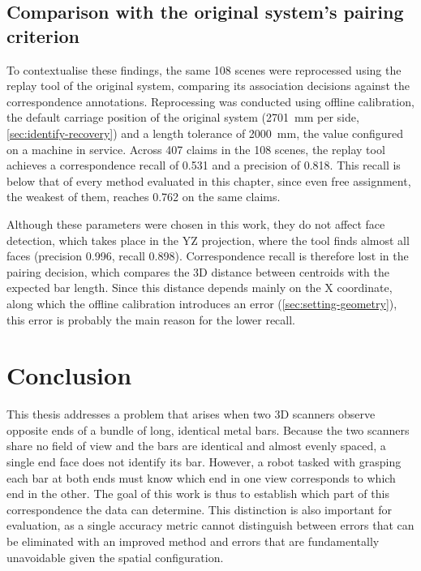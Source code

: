 \documentclass[a4paper, 12pt, twoside]{book}
\begin{document}
\section{Comparison with the original system's pairing criterion}
\label{sec:eval-original}

To contextualise these findings, the same 108 scenes were reprocessed using the replay tool of the original system, comparing its association decisions against the correspondence annotations. Reprocessing was conducted using offline calibration, the default carriage position of the original system (2701~mm per side, \cref{sec:identify-recovery}) and a length tolerance of 2000~mm, the value configured on a machine in service. Across 407 claims in the 108 scenes, the replay tool achieves a correspondence recall of 0.531 and a precision of 0.818. This recall is below that of every method evaluated in this chapter, since even free assignment, the weakest of them, reaches 0.762 on the same claims.

Although these parameters were chosen in this work, they do not affect face detection, which takes place in the YZ projection, where the tool finds almost all faces (precision 0.996, recall 0.898). Correspondence recall is therefore lost in the pairing decision, which compares the 3D distance between centroids with the expected bar length. Since this distance depends mainly on the X coordinate, along which the offline calibration introduces an error (\cref{sec:setting-geometry}), this error is probably the main reason for the lower recall.

\chapter{Conclusion}
\label{ch:conclusion}

This thesis addresses a problem that arises when two 3D scanners observe opposite ends of a bundle of long, identical metal bars. Because the two scanners share no field of view and the bars are identical and almost evenly spaced, a single end face does not identify its bar. However, a robot tasked with grasping each bar at both ends must know which end in one view corresponds to which end in the other. The goal of this work is thus to establish which part of this correspondence the data can determine. This distinction is also important for evaluation, as a single accuracy metric cannot distinguish between errors that can be eliminated with an improved method and errors that are fundamentally unavoidable given the spatial configuration.
\end{document}
